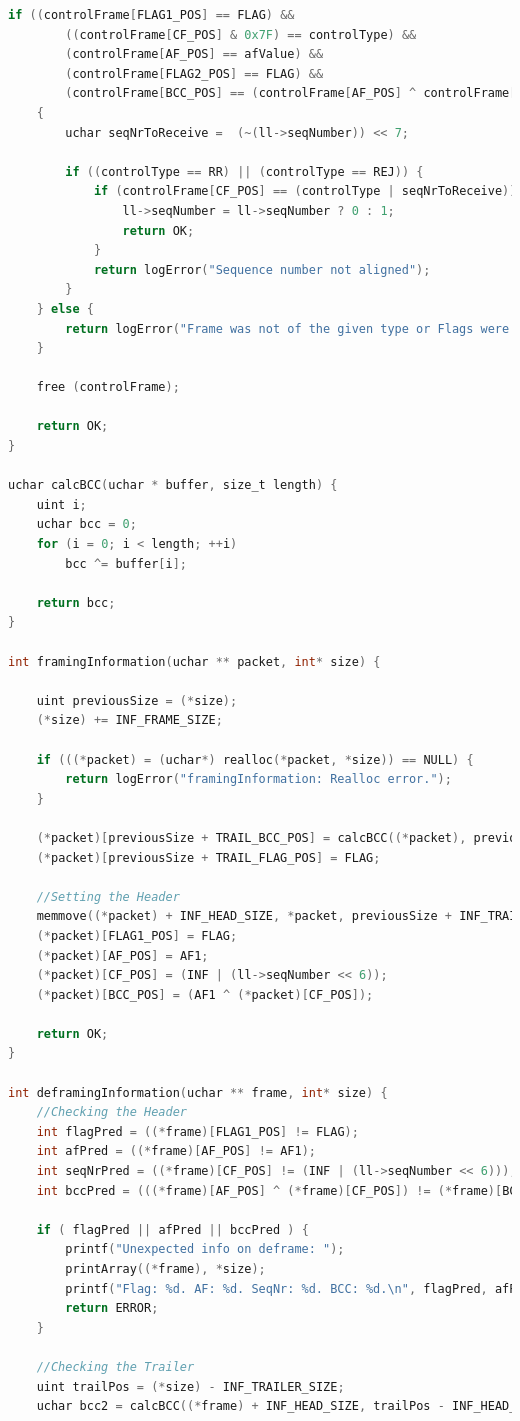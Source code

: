 \documentclass[a4paper, 11pt]{article}
\begin{document}
\begin{lstlisting}[language=C]
	if ((controlFrame[FLAG1_POS] == FLAG) &&
		((controlFrame[CF_POS] & 0x7F) == controlType) &&
		(controlFrame[AF_POS] == afValue) &&
		(controlFrame[FLAG2_POS] == FLAG) &&
		(controlFrame[BCC_POS] == (controlFrame[AF_POS] ^ controlFrame[CF_POS])))
	{
		uchar seqNrToReceive =  (~(ll->seqNumber)) << 7;

		if ((controlType == RR) || (controlType == REJ)) {
			if (controlFrame[CF_POS] == (controlType | seqNrToReceive)) {
				ll->seqNumber = ll->seqNumber ? 0 : 1;
				return OK;
			}
			return logError("Sequence number not aligned");
		}
	} else {
		return logError("Frame was not of the given type or Flags were not recognized");
	}

	free (controlFrame);

	return OK;
}

uchar calcBCC(uchar * buffer, size_t length) {
	uint i;
	uchar bcc = 0;
	for (i = 0; i < length; ++i)
		bcc ^= buffer[i];

	return bcc;
}

int framingInformation(uchar ** packet, int* size) {

	uint previousSize = (*size);
	(*size) += INF_FRAME_SIZE;

	if (((*packet) = (uchar*) realloc(*packet, *size)) == NULL) {
		return logError("framingInformation: Realloc error.");
	}

	(*packet)[previousSize + TRAIL_BCC_POS] = calcBCC((*packet), previousSize);
	(*packet)[previousSize + TRAIL_FLAG_POS] = FLAG;

	//Setting the Header
	memmove((*packet) + INF_HEAD_SIZE, *packet, previousSize + INF_TRAILER_SIZE);
	(*packet)[FLAG1_POS] = FLAG;
	(*packet)[AF_POS] = AF1;
	(*packet)[CF_POS] = (INF | (ll->seqNumber << 6));
	(*packet)[BCC_POS] = (AF1 ^ (*packet)[CF_POS]);

	return OK;
}

int deframingInformation(uchar ** frame, int* size) {
	//Checking the Header
	int flagPred = ((*frame)[FLAG1_POS] != FLAG);
	int afPred = ((*frame)[AF_POS] != AF1);
	int seqNrPred = ((*frame)[CF_POS] != (INF | (ll->seqNumber << 6)));
	int bccPred = (((*frame)[AF_POS] ^ (*frame)[CF_POS]) != (*frame)[BCC_POS]);

	if ( flagPred || afPred || bccPred ) {
		printf("Unexpected info on deframe: ");
		printArray((*frame), *size);
		printf("Flag: %d. AF: %d. SeqNr: %d. BCC: %d.\n", flagPred, afPred, seqNrPred, bccPred);
		return ERROR;
	}

	//Checking the Trailer
	uint trailPos = (*size) - INF_TRAILER_SIZE;
	uchar bcc2 = calcBCC((*frame) + INF_HEAD_SIZE, trailPos - INF_HEAD_SIZE);


\end{lstlisting}
\end{document}
